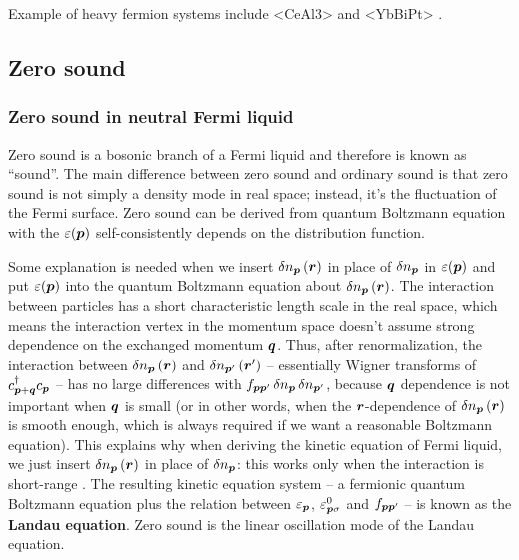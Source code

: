 \documentclass[hyperref, a4paper]{article}
\newcommand*{\concept}[1]{{\textbf{#1}}}
\def\ce#1{<#1>}%
\begin{document}
Example of heavy fermion systems include \ce{CeAl3} \cite{PhysRevLett.35.1779} 
and \ce{YbBiPt} \cite{fisk1991massive}.

\subsection{Zero sound}

\subsubsection{Zero sound in neutral Fermi liquid}

Zero sound is a bosonic branch of a Fermi liquid and therefore is known as ``sound''.
The main difference between zero sound and ordinary sound
is that zero sound is not simply a density mode in real space;
instead, it's the fluctuation of the Fermi surface.
Zero sound can be derived from quantum Boltzmann equation 
with the $\varepsilon(\vb*{p})$ 
self-consistently depends on the distribution function.

Some explanation is needed when we insert $\var{n_{\vb*{p}}}(\vb*{r})$
in place of $\var{n_{\vb*{p}}}$ in $\varepsilon(\vb*{p})$
and put $\varepsilon(\vb*{p})$ into the quantum Boltzmann equation about $\var{n_{\vb*{p}}}(\vb*{r})$.
The interaction between particles has 
a short characteristic length scale in the real space,
which means the interaction vertex in the momentum space 
doesn't assume strong dependence on the exchanged momentum $\vb*{q}$.
Thus, after renormalization, the interaction between $\var{n}_{\vb*{p}}(\vb*{r})$
and $\var{n}_{\vb*{p}'} (\vb*{r}')$
-- essentially Wigner transforms of $c^\dagger_{\vb*{p} + \vb*{q}} c_{\vb*{p}}$ --
has no large differences with 
$f_{\vb*{p} \vb*{p}'} \var{n}_{\vb*{p}} \var{n}_{\vb*{p}'}$,
because $\vb*{q}$ dependence is not important when $\vb*{q}$ is small 
(or in other words, when the $\vb*{r}$-dependence of $\var{n_{\vb*{p}}}(\vb*{r})$
is smooth enough, which is always required if we want a reasonable Boltzmann equation).
This explains why when deriving the kinetic equation of Fermi liquid, 
we just insert $\var{n}_{\vb*{p}}(\vb*{r})$ in place of $\var{n}_{\vb*{p}}$:
this works only when the interaction is short-range
\cite{pines2018theory}.
The resulting kinetic equation system -- 
a fermionic quantum Boltzmann equation 
plus the relation between $\varepsilon_{\vb*{p}}$, 
$\varepsilon_{\vb*{p} \sigma}^0$ and $f_{\vb*{p} \vb*{p}'}$ -- 
is known as the \concept{Landau equation}.
Zero sound is the linear oscillation mode of the Landau equation.
\end{document}
